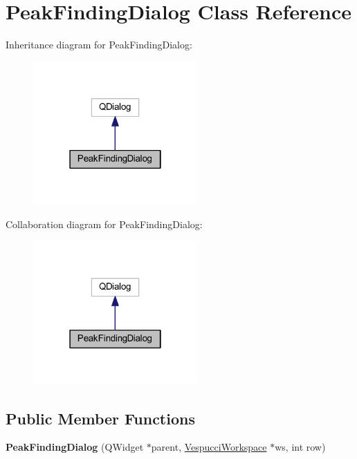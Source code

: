 \hypertarget{class_peak_finding_dialog}{\section{Peak\+Finding\+Dialog Class Reference}
\label{class_peak_finding_dialog}
}


Inheritance diagram for Peak\+Finding\+Dialog\+:\nopagebreak
\begin{figure}[H]
\begin{center}
\leavevmode
\includegraphics[width=178pt]{class_peak_finding_dialog__inherit__graph}
\end{center}
\end{figure}


Collaboration diagram for Peak\+Finding\+Dialog\+:\nopagebreak
\begin{figure}[H]
\begin{center}
\leavevmode
\includegraphics[width=178pt]{class_peak_finding_dialog__coll__graph}
\end{center}
\end{figure}
\subsection*{Public Member Functions}
\begin{DoxyCompactItemize}
\item 
\hypertarget{class_peak_finding_dialog_a54af1e6e71dd37a1f1320eda91b06630}{{\bfseries Peak\+Finding\+Dialog} (Q\+Widget $\ast$parent, \hyperlink{class_vespucci_workspace}{Vespucci\+Workspace} $\ast$ws, int row)}\label{class_peak_finding_dialog_a54af1e6e71dd37a1f1320eda91b06630}

\end{DoxyCompactItemize}


